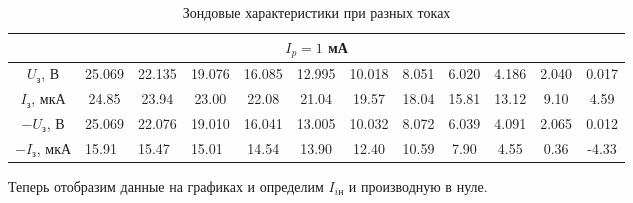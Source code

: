 \documentclass[12pt,a4paper]{article}
\begin{document}
\begin{table}[H]
{\begin{tabular}[]{|c|c|c|c|c|c|c|c|c|c|c|c|}
\multicolumn{12}{|c|}{$I_p = 1$ мА} \\
        \hline
       $U_з$, В                          & 25.069                     & 22.135                     & 19.076                     & 16.085 & 12.995 & 10.018 & 8.051 & 6.020 & 4.186 & 2.040 & 0.017 \\ \hline
$I_з$, мкА                        & 24.85                      & 23.94                      & 23.00                      & 22.08  & 21.04  & 19.57  & 18.04 & 15.81 & 13.12 & 9.10  & 4.59  \\ \hline
$-U_з$, В                         & 25.069                     & 22.076                     & 19.010                     & 16.041 & 13.005 & 10.032 & 8.072 & 6.039 & 4.091 & 2.065 & 0.012 \\ \hline
\multicolumn{1}{|l|}{$-I_з$, мкА} & \multicolumn{1}{l|}{15.91} & \multicolumn{1}{l|}{15.47} & \multicolumn{1}{l|}{15.01} & 14.54  & 13.90  & 12.40  & 10.59 & 7.90  & 4.55  & 0.36  & -4.33 \\ \hline
    \end{tabular}}
    \caption{Зондовые характеристики при разных токах}
\end{table}

Теперь отобразим данные на графиках и определим $I_{iн}$ и производную в нуле.
\end{document}
